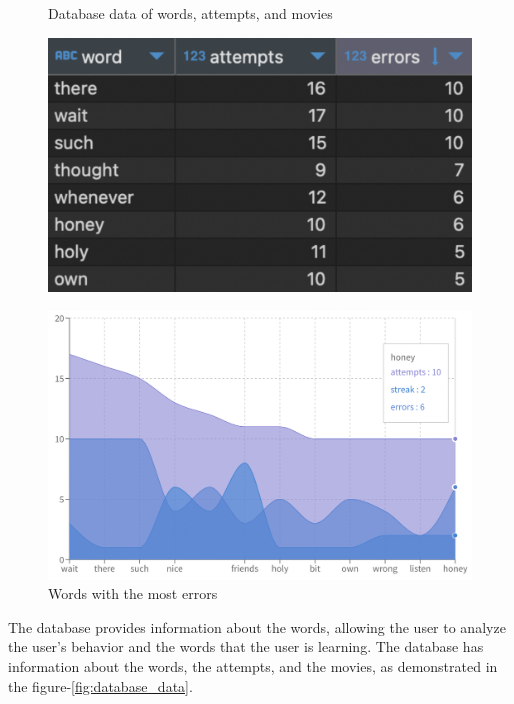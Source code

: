 \documentclass[12pt]{article}
\begin{document}
\begin{frame}{}
  \begin{figure}[!h]
      \begin{minipage}[b]{0.5\linewidth}
        \centering
        \caption{
        Database data of words, attempts, and movies
        }
        \label{fig:database_data}
        \includegraphics[width=1\textwidth]{assets/32.png}
      \end{minipage}
      \hspace{0.1cm}
      \begin{minipage}[b]{0.5\linewidth}

        \centering
        \caption{
        Words with the most errors
        }
        \label{fig:database_errors}
        \includegraphics[width=1\textwidth]{assets/30.png}
       \end{minipage}
  \end{figure}
\end{frame}
The database provides information about the words, allowing the user to analyze the user's behavior and the words that the user is learning. The database has information about the words, the attempts, and the movies, as demonstrated in the figure-\ref{fig:database_data}. 
\end{document}
